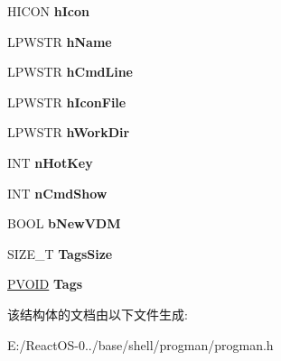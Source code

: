 \begin{DoxyCompactItemize}
H\+I\+C\+ON {\bfseries h\+Icon}
\item 
\mbox{\label{struct___p_r_o_g_r_a_m_a19976b2cf635e4b732de5d00ccfd27d7}} 
L\+P\+W\+S\+TR {\bfseries h\+Name}
\item 
\mbox{\label{struct___p_r_o_g_r_a_m_a3638cce6c9536dec18c4f2c85610f3d5}} 
L\+P\+W\+S\+TR {\bfseries h\+Cmd\+Line}
\item 
\mbox{\label{struct___p_r_o_g_r_a_m_af28d3eec164baf8a1df4df7a2d21e838}} 
L\+P\+W\+S\+TR {\bfseries h\+Icon\+File}
\item 
\mbox{\label{struct___p_r_o_g_r_a_m_a5fdd88d477050104d029983e02de4f41}} 
L\+P\+W\+S\+TR {\bfseries h\+Work\+Dir}
\item 
\mbox{\label{struct___p_r_o_g_r_a_m_a3a7afeede6f7b4719fecfddd4901ffe6}} 
I\+NT {\bfseries n\+Hot\+Key}
\item 
\mbox{\label{struct___p_r_o_g_r_a_m_a18363064fad222c547676a6b79279af7}} 
I\+NT {\bfseries n\+Cmd\+Show}
\item 
\mbox{\label{struct___p_r_o_g_r_a_m_a485dfcae104ebd86424774650562ea5f}} 
B\+O\+OL {\bfseries b\+New\+V\+DM}
\item 
\mbox{\label{struct___p_r_o_g_r_a_m_a8ec31c96ebedf364c691139a1fb9391c}} 
S\+I\+Z\+E\+\_\+T {\bfseries Tags\+Size}
\item 
\mbox{\label{struct___p_r_o_g_r_a_m_aa860562589284690f1f3546e71b2d354}} 
\hyperlink{interfacevoid}{P\+V\+O\+ID} {\bfseries Tags}
\end{DoxyCompactItemize}


该结构体的文档由以下文件生成\+:\begin{DoxyCompactItemize}
\item 
E\+:/\+React\+O\+S-\/0../base/shell/progman/progman.\+h\end{DoxyCompactItemize}

